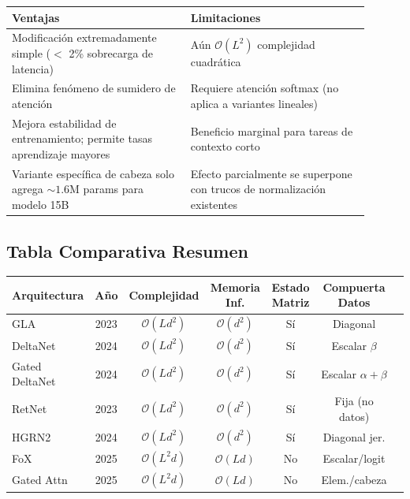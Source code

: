 \documentclass[11pt,a4paper]{article}
\begin{document}
\begin{table}[h]
\centering
\begin{tabular}{|p{0.45\linewidth}|p{0.45\linewidth}|}
\hline
\textbf{Ventajas} & \textbf{Limitaciones} \\
\hline
Modificación extremadamente simple ($<$ 2\% sobrecarga de latencia) & Aún $\mathcal{O}(L^2)$ complejidad cuadrática \\
\hline
Elimina fenómeno de sumidero de atención & Requiere atención softmax (no aplica a variantes lineales) \\
\hline
Mejora estabilidad de entrenamiento; permite tasas aprendizaje mayores & Beneficio marginal para tareas de contexto corto \\
\hline
Variante específica de cabeza solo agrega $\sim 1.6$M params para modelo 15B & Efecto parcialmente se superpone con trucos de normalización existentes \\
\hline
\end{tabular}
\end{table}

\subsection{Tabla Comparativa Resumen}

\begin{table}[h]
\centering
\small
\begin{tabular}{|l|c|c|c|c|c|c|}
\hline
\textbf{Arquitectura} & \textbf{Año} & \textbf{Complejidad} & \textbf{Memoria Inf.} & \textbf{Estado Matriz} & \textbf{Compuerta Datos} \\
\hline
GLA & 2023 & $\mathcal{O}(Ld^2)$ & $\mathcal{O}(d^2)$ & Sí & Diagonal \\
\hline
DeltaNet & 2024 & $\mathcal{O}(Ld^2)$ & $\mathcal{O}(d^2)$ & Sí & Escalar $\beta$ \\
\hline
Gated DeltaNet & 2024 & $\mathcal{O}(Ld^2)$ & $\mathcal{O}(d^2)$ & Sí & Escalar $\alpha + \beta$ \\
\hline
RetNet & 2023 & $\mathcal{O}(Ld^2)$ & $\mathcal{O}(d^2)$ & Sí & Fija (no datos) \\
\hline
HGRN2 & 2024 & $\mathcal{O}(Ld^2)$ & $\mathcal{O}(d^2)$ & Sí & Diagonal jer. \\
\hline
FoX & 2025 & $\mathcal{O}(L^2d)$ & $\mathcal{O}(Ld)$ & No & Escalar/logit \\
\hline
Gated Attn & 2025 & $\mathcal{O}(L^2d)$ & $\mathcal{O}(Ld)$ & No & Elem./cabeza \\
\hline
\end{tabular}
\end{table}
\end{document}
